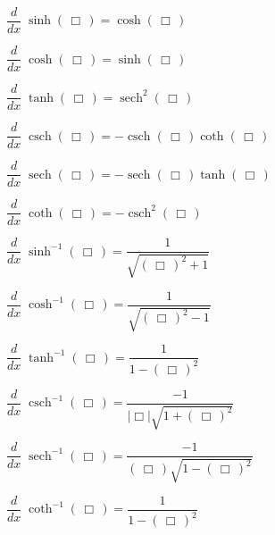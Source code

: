 \documentclass[11pt,letterpaper]{article}
\newenvironment{2enumerate}{%
	\begin{itemize}
	\begin{multicols}{2}
	}{%
	\end{multicols}
	\end{itemize}
}
\DeclareMathOperator{\sech}{sech}
\DeclareMathOperator{\csch}{csch}
\begin{document}
\begin{2enumerate}
\item $\dfrac{d}{dx}\; \sinh \left(\, \Box \,\right) = \cosh \left(\, \Box \,\right)$ \par\vspace{0.05cm}
\item $\dfrac{d}{dx}\; \cosh \left(\, \Box \,\right) = \sinh \left(\, \Box \,\right)$ \par\vspace{0.05cm}
\item $\dfrac{d}{dx}\; \tanh \left(\, \Box \,\right) = \sech^2 \left(\, \Box \,\right)$ \par\vspace{0.05cm}
\item $\dfrac{d}{dx}\; \csch \left(\, \Box \,\right) = -\csch \left(\, \Box \,\right) \coth \left(\, \Box \,\right)$ \par\vspace{0.05cm}
\item $\dfrac{d}{dx}\; \sech \left(\, \Box \,\right) = -\sech \left(\, \Box \,\right) \tanh \left(\, \Box \,\right)$ \par\vspace{0.05cm}
\item $\dfrac{d}{dx}\;  \coth \left(\, \Box \,\right) = -\csch^2 \left(\, \Box \,\right)$ \par\vspace{0.05cm}
\item $\dfrac{d}{dx}\;  \sinh^{-1} \left(\, \Box \,\right) = \dfrac{1}{\sqrt{\left(\, \Box \,\right)^2 + 1}}$ \par\vspace{0.05cm}
\item $\dfrac{d}{dx}\; \cosh^{-1} \left(\, \Box \,\right) = \dfrac{1}{\sqrt{\left(\, \Box \,\right)^2 -1}}$ \par\vspace{0.05cm}
\item $\dfrac{d}{dx}\; \tanh^{-1} \left(\, \Box \,\right) = \dfrac{1}{1 - \left(\, \Box \,\right)^2}$ \par\vspace{0.05cm}
\item $\dfrac{d}{dx}\; \csch^{-1} \left(\, \Box \,\right) = \dfrac{-1}{| \Box | \sqrt{1 + \left(\, \Box \,\right)^2}}$ \par\vspace{0.05cm}
\item $\dfrac{d}{dx}\; \sech^{-1} \left(\, \Box \,\right) = \dfrac{-1}{\left(\, \Box \,\right) \sqrt{1 - \left(\, \Box \,\right)^2}}$ \par\vspace{0.05cm}
\item $\dfrac{d}{dx}\; \coth^{-1} \left(\, \Box \,\right) = \dfrac{1}{1 - \left(\, \Box \,\right)^2}$ \par\vspace{0.05cm}
\end{2enumerate}

\vfill
\end{document}
